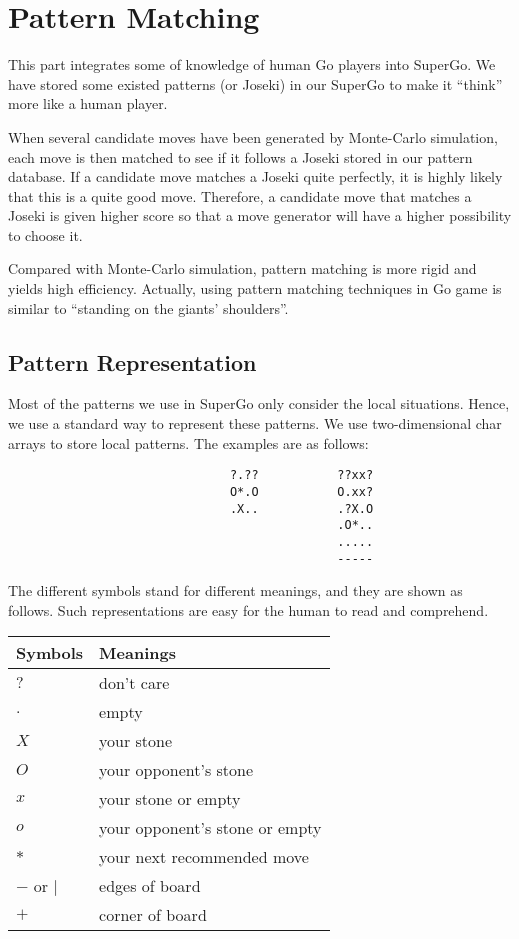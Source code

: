 \section{Pattern Matching}

This part integrates some of knowledge of human Go players into SuperGo. We have stored some existed patterns (or Joseki) in our SuperGo to make it ``think'' more like a human player. 

When several candidate moves have been generated by Monte-Carlo simulation, each move is then matched to see if it follows a Joseki stored in our pattern database. If a candidate move matches a Joseki quite perfectly, it is highly likely that this is a quite good move. Therefore, a candidate move that matches a Joseki is given higher score so that a move generator will have a higher possibility to choose it.

Compared with Monte-Carlo simulation, pattern matching is more rigid and yields high efficiency. Actually, using pattern matching techniques in Go game is similar to ``standing on the giants' shoulders''.

\subsection{Pattern Representation}

Most of the patterns we use in SuperGo only consider the local situations. Hence, we use a standard way to represent these patterns. We use two-dimensional char arrays to store local patterns. The examples are as follows:

\begin{verbatim}
                               ?.??           ??xx?
                               O*.O           O.xx?
                               .X..           .?X.O
                                              .O*..
                                              .....
                                              -----
\end{verbatim}

The different symbols stand for different meanings, and they are shown as follows. Such representations are easy for the human to read and comprehend.

\begin{center}
\begin{tabular}{l|l}
\textbf{Symbols} & \textbf{Meanings} \\ \hline
$?$ & don't care \\
$.$ & empty \\
$X$ & your stone \\
$O$ & your opponent's stone \\
$x$ & your stone or empty \\
$o$ & your opponent's stone or empty \\
$*$ & your next recommended move \\
$-$ or $\mid$ & edges of board \\
$+$ & corner of board \\
\end{tabular}
\end{center}

